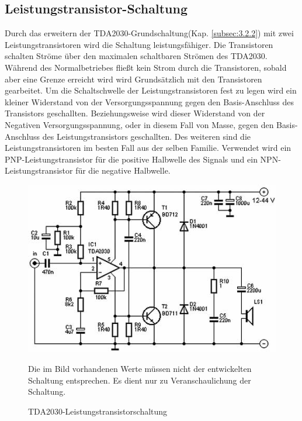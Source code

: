 \subsection{Leistungstransistor-Schaltung}\label{subsec:3.2.3}
Durch das erweitern der TDA2030-Grundschaltung(Kap. \ref{subsec:3.2.2}) mit zwei Leistungstransistoren wird die Schaltung leistungsfähiger. Die Transistoren schalten Ströme über den maximalen schaltbaren Strömen des TDA2030. Während des Normalbetriebes fließt kein Strom durch die Transistoren, sobald aber eine Grenze erreicht wird wird Grundsätzlich mit den Transistoren gearbeitet. Um die Schaltschwelle der Leistungstransistoren fest zu legen wird ein kleiner Widerstand von der Versorgungsspannung gegen den Basis-Anschluss des Transistors geschallten. Beziehungsweise wird dieser Widerstand von der Negativen Versorgungsspannung, oder in diesem Fall von Masse, gegen den Basis-Anschluss des Leistungstransistors geschallten.
Des weiteren sind die Leistungstransistoren im besten Fall aus der selben Familie. Verwendet wird ein PNP-Leistungstransistor für die positive Halbwelle des Signals und ein NPN-Leistungstransistor für die negative Halbwelle.
\begin{figure} [H]
	\centering
	\includegraphics[width=1\textwidth]{img/Grundlagen/TDA2030/TDA2030-Leistungstransschaltung.jpg}
	\caption{TDA2030-Leistungstransistorschaltung}
	\text Die im Bild vorhandenen Werte müssen nicht der entwickelten Schaltung entsprechen. Es dient nur zu Veranschaulichung der Schaltung.
	\label {fig:3.2.3.1}
\end{figure}


